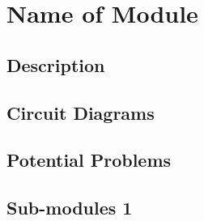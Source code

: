 
\chapter{Name of Module}

\section{Description}


\section{Circuit Diagrams}


\section{Potential Problems}


\section{Sub-modules 1}

